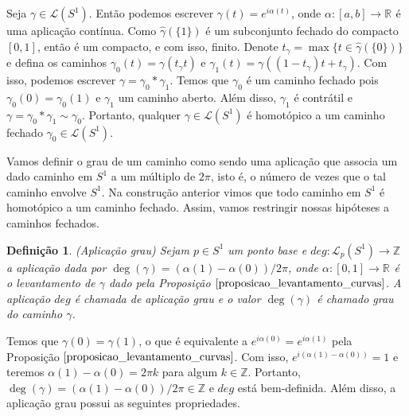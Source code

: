 \documentclass[12pt]{book}
\newtheorem{definicao}[teorema]{Definição}
\newcommand{\caminhos}{\mathcal{L}}
\newcommand{\caminhossempontobase}[1]{\caminhos(#1)}
\newcommand{\caminhospontobasegeral}[2]{\caminhos_{#1}(#2)}
\newcommand{\circulo}{S^{1}}
\newcommand{\inteiros}{\mathbb{Z}}
\newcommand{\intervalo}{[0,1]}
\newcommand{\real}[1]{\mathbb{R}^{#1}}
\newcommand{\reta}{\real{}}
\begin{document}
	Seja $\gamma \in \caminhossempontobase{\circulo}$. Então podemos escrever $\gamma(t) = e^{i\alpha(t)}$, onde $\alpha:[a,b]\to \reta$ é uma aplicação contínua. Como $\hat{\gamma} (\{1\})$ é um subconjunto fechado do compacto $\intervalo$, então é um compacto, e com isso, finito. Denote $t_{\gamma} = \max\{t \in \hat{\gamma} (\{0\})\}$ e defina os caminhos $\gamma_{0}(t) = \gamma(t_{\gamma}t)$ e $\gamma_{1}(t) = \gamma((1-t_{\gamma})t+t_{\gamma})$. Com isso, podemos escrever $\gamma = \gamma_{0}*\gamma_{1}$. Temos que $\gamma_{0}$ é um caminho fechado pois $\gamma_{0}(0) = \gamma_{0}(1)$ e $\gamma_{1}$ um caminho aberto. Além disso, $\gamma_{1}$ é contrátil e $\gamma = \gamma_{0}*\gamma_{1} \sim \gamma_{0}$. Portanto, qualquer $\gamma \in \caminhos(\circulo)$ é homotópico a um caminho fechado $\gamma_{0} \in \caminhos(\circulo)$.
	
	Vamos definir o grau de um caminho como sendo uma aplicação que associa um dado caminho em $\circulo$ a um múltiplo de $2\pi$, isto é, o número de vezes que o tal caminho envolve $\circulo$. Na construção anterior vimos que todo caminho em $\circulo$ é homotópico a um caminho fechado. Assim, vamos restringir nossas hipóteses a caminhos fechados.

	\begin{definicao}\label{definicao_aplicacao_grau}
		(Aplicação grau) Sejam $p \in \circulo$ um ponto base e $deg: \caminhospontobasegeral{p}{\circulo} \to \inteiros$ a aplicação dada por $\deg(\gamma) = (\alpha(1)-\alpha(0))/2\pi$, onde $\alpha:[0,1] \to \real{}$ é o levantamento de $\gamma$ dado pela Proposição $\ref{proposicao_levantamento_curvas}$. A aplicação $deg$ é chamada de aplicação grau e o valor $\deg(\gamma)$ é chamado grau do caminho $\gamma$.
	\end{definicao}
	
	Temos que $\gamma(0) = \gamma(1)$, o que é equivalente a $e^{i\alpha(0)} = e^{i\alpha(1)}$ pela Proposição $\ref{proposicao_levantamento_curvas}$. Com isso, $e^{i(\alpha(1)-\alpha(0))} = 1$ e teremos $\alpha(1)-\alpha(0) = 2\pi k$ para algum $k \in \inteiros$. Portanto, $\deg(\gamma) = (\alpha(1)-\alpha(0))/2\pi \in \inteiros$ e $deg$ está bem-definida. Além disso, a aplicação grau possui as seguintes propriedades.
	
\end{document}
